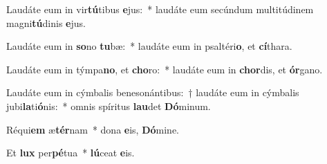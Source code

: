 \item Laudáte eum in vir\textbf{tú}tibus \textbf{e}jus:~* laudáte eum secúndum multitúdinem magni\textbf{tú}dinis \textbf{e}jus.

\item Laudáte eum in \textbf{so}no \textbf{tu}bæ:~* laudáte eum in psaltéri\textbf{o}, et \textbf{cí}thara.

\item Laudáte eum in týmpa\textbf{no}, et \textbf{cho}ro:~* laudáte eum in \textbf{chor}dis, et \textbf{ór}gano.

\item Laudáte eum in cýmbalis benesonántibus:~† laudáte eum in cýmbalis jubi\textbf{la}ti\textbf{ó}nis:~* omnis spíritus \textbf{lau}det \textbf{Dó}minum.

\item Réqui\textbf{em} æ\textbf{tér}nam~* dona \textbf{e}is, \textbf{Dó}mine.

\item Et \textbf{lux} per\textbf{pé}tua~* \textbf{lú}ceat \textbf{e}is.